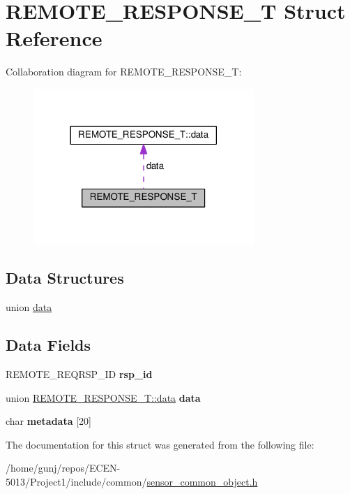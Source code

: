 \hypertarget{structREMOTE__RESPONSE__T}{}\section{R\+E\+M\+O\+T\+E\+\_\+\+R\+E\+S\+P\+O\+N\+S\+E\+\_\+T Struct Reference}
\label{structREMOTE__RESPONSE__T}


Collaboration diagram for R\+E\+M\+O\+T\+E\+\_\+\+R\+E\+S\+P\+O\+N\+S\+E\+\_\+T\+:\nopagebreak
\begin{figure}[H]
\begin{center}
\leavevmode
\includegraphics[width=237pt]{structREMOTE__RESPONSE__T__coll__graph}
\end{center}
\end{figure}
\subsection*{Data Structures}
\begin{DoxyCompactItemize}
\item 
union \hyperlink{unionREMOTE__RESPONSE__T_1_1data}{data}
\end{DoxyCompactItemize}
\subsection*{Data Fields}
\begin{DoxyCompactItemize}
\item 
R\+E\+M\+O\+T\+E\+\_\+\+R\+E\+Q\+R\+S\+P\+\_\+\+ID {\bfseries rsp\+\_\+id}\hypertarget{structREMOTE__RESPONSE__T_aeffb937926ea1d5ae378d59eec691357}{}\label{structREMOTE__RESPONSE__T_aeffb937926ea1d5ae378d59eec691357}

\item 
union \hyperlink{unionREMOTE__RESPONSE__T_1_1data}{R\+E\+M\+O\+T\+E\+\_\+\+R\+E\+S\+P\+O\+N\+S\+E\+\_\+\+T\+::data} {\bfseries data}\hypertarget{structREMOTE__RESPONSE__T_a7cf162cedf8f984c2f287815632fdfd0}{}\label{structREMOTE__RESPONSE__T_a7cf162cedf8f984c2f287815632fdfd0}

\item 
char {\bfseries metadata} \mbox{[}20\mbox{]}\hypertarget{structREMOTE__RESPONSE__T_a3382443efefd8a97a65e01578dfa9246}{}\label{structREMOTE__RESPONSE__T_a3382443efefd8a97a65e01578dfa9246}

\end{DoxyCompactItemize}


The documentation for this struct was generated from the following file\+:\begin{DoxyCompactItemize}
\item 
/home/gunj/repos/\+E\+C\+E\+N-\/5013/\+Project1/include/common/\hyperlink{sensor__common__object_8h}{sensor\+\_\+common\+\_\+object.\+h}\end{DoxyCompactItemize}

